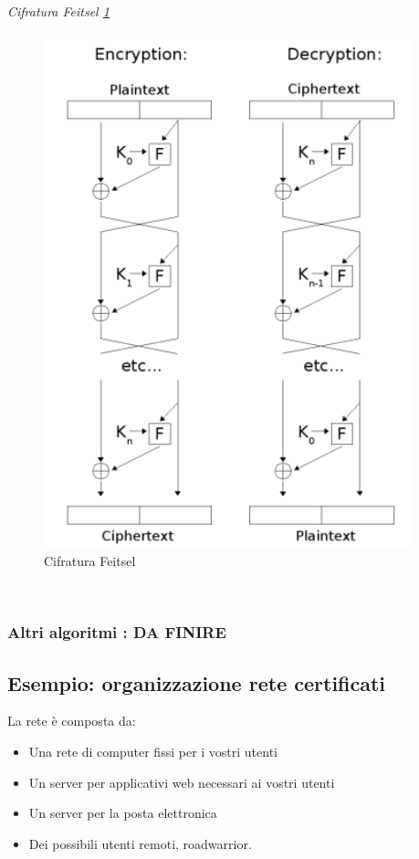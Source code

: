 \documentclass[12pt]{article}
\begin{document}
				\textit{Cifratura Feitsel \ref{fig:21}}\\
				\begin{figure}[h!]
					\centering
					\includegraphics[scale=0.60]{img/feit.PNG}
					\caption{Cifratura Feitsel \label{fig:21}}
				\end{figure}\\
			
			\subsubsection{Altri algoritmi : DA FINIRE}
			
		\subsection{Esempio: organizzazione rete certificati}
			La rete è composta da:
			\begin{itemize}
				\item Una rete di computer fissi per i vostri utenti
				\item Un server per applicativi web necessari ai vostri utenti
				\item Un server per la posta elettronica
				\item Dei possibili utenti remoti, roadwarrior.
			\end{itemize}
			
\end{document}
